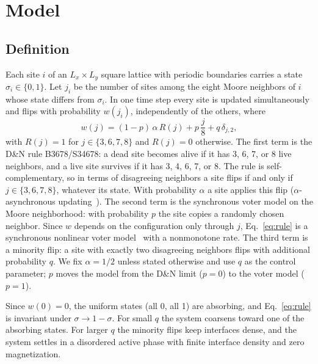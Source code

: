 \documentclass[pre,twocolumn,superscriptaddress,showpacs,floatfix]{revtex4-2}
\begin{document}
\section{Model}
\label{sec:model}

\subsection{Definition}

Each site $i$ of an $L_x\times L_y$ square lattice with periodic boundaries carries a state
$\sigma_i\in\{0,1\}$. Let $j_i$ be the number of sites among the eight Moore neighbors of $i$
whose state differs from $\sigma_i$. In one time step every site is updated simultaneously and
flips with probability $w(j_i)$, independently of the others, where
\begin{equation}
w(j) = (1-p)\,\alpha\,R(j) + p\,\frac{j}{8} + q\,\delta_{j,2},
\label{eq:rule}
\end{equation}
with $R(j) = 1$ for $j\in\{3,6,7,8\}$ and $R(j) = 0$ otherwise. The first term is the D\&N rule
B3678/S34678: a dead site becomes alive if it has 3, 6, 7, or 8
live neighbors, and a live site survives if it has 3, 4, 6, 7, or 8. The rule is
self-complementary, so in terms of disagreeing neighbors a site flips if and only if
$j\in\{3,6,7,8\}$, whatever its state. With probability $\alpha$ a site applies this flip
($\alpha$-asynchronous updating~\cite{fates2005,blok1999}). The second term is the synchronous
voter model on the Moore neighborhood: with probability $p$ the site copies a randomly chosen
neighbor. Since $w$ depends on the configuration only through $j$, Eq.~\eqref{eq:rule} is a
synchronous nonlinear voter model~\cite{cox1991,molofsky1999,schweitzer2009} with a nonmonotone
rate. The third term is a minority flip: a site with exactly two disagreeing neighbors flips
with additional probability $q$. We fix $\alpha = 1/2$ unless stated otherwise and use $q$ as the
control parameter; $p$ moves the model from the D\&N limit ($p = 0$) to the voter model ($p = 1$).

Since $w(0) = 0$, the uniform states (all 0, all 1) are absorbing, and Eq.~\eqref{eq:rule} is
invariant under $\sigma\to 1-\sigma$. For small $q$ the system coarsens toward one of the
absorbing states. For larger $q$ the minority flips keep interfaces dense, and the system settles
in a disordered active phase with finite interface density and zero magnetization.
\end{document}
